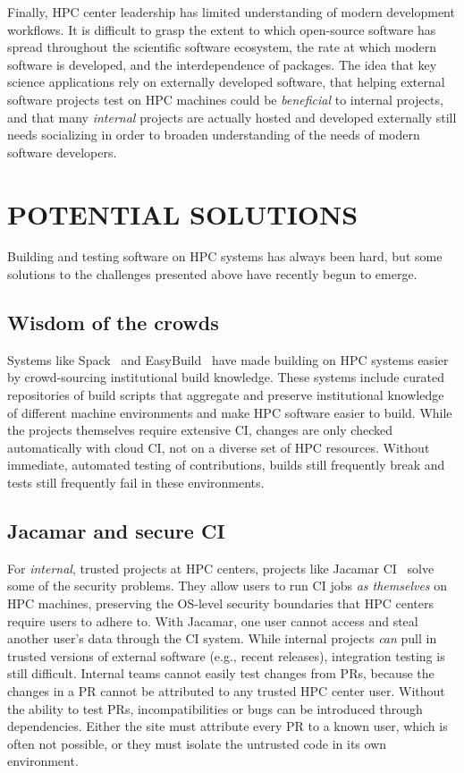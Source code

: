 \documentclass{IEEEcsmag}
\begin{document}
Finally, HPC center leadership has limited understanding of modern development workflows. 
It is difficult to grasp the extent to which open-source software has spread
throughout the scientific software ecosystem, the rate at which modern software is
developed, and the interdependence of packages. The idea that key science applications
rely on externally developed software, that helping external software projects test on
HPC machines could be {\it beneficial} to internal projects, and that many {\it
  internal} projects are actually hosted and developed externally still needs
socializing in order to broaden understanding of the needs of modern software
developers.

\section{POTENTIAL SOLUTIONS}

Building and testing software on HPC systems has always been hard, but some solutions
to the challenges presented above have recently begun to emerge.

\subsection{Wisdom of the crowds}

Systems like Spack~\cite{gamblin+:sc15} and EasyBuild~\cite{hoste+:pyhpc12} have made
building on HPC systems easier by crowd-sourcing institutional build knowledge. These
systems include curated repositories of build scripts that aggregate and preserve
institutional knowledge of different machine environments and make HPC software easier
to build. While the projects themselves require extensive CI, changes are only checked
automatically with cloud CI, not on a diverse set of HPC resources. Without immediate,
automated testing of contributions, builds still frequently break and tests still frequently
fail in these environments.


\subsection{Jacamar and secure CI}

For {\it internal}, trusted projects at HPC centers, projects like Jacamar CI~\cite{jacamar-ci}
solve some of the security problems. They allow users to run CI jobs {\it as themselves} on HPC
machines, preserving the OS-level security boundaries that HPC centers require users to
adhere to. With Jacamar, one user cannot access and steal another user's data through the CI
system.
While internal projects {\it can} pull in trusted versions of external
software (e.g., recent releases), integration testing is still difficult. Internal
teams cannot easily test changes from PRs, because the changes in a PR cannot be
attributed to any trusted HPC center user. Without the ability to test PRs, incompatibilities
or bugs can be introduced through dependencies. Either the site must attribute every
PR to a known user, which is often not possible, or they must isolate the untrusted code
in its own environment.
\end{document}
